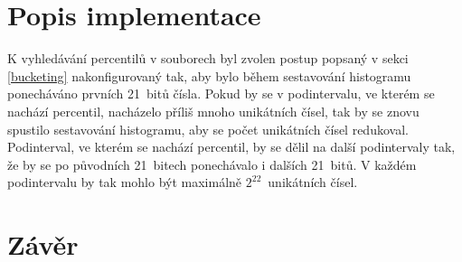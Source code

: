 \documentclass[12pt, a4paper]{article}
\newcommand{\bucketingparamone}{21}
\newcommand{\bucketingparamtwo}{21}
\newcommand{\bucketingparamthree}{22}
\let\oldsection\section
\renewcommand\section{\clearpage\oldsection}
\begin{document}
\section{Popis implementace}

K vyhledávání percentilů v souborech byl zvolen postup popsaný v sekci \ref{bucketing} nakonfigurovaný tak, aby bylo během sestavování histogramu ponecháváno prvních \bucketingparamone~bitů čísla.
Pokud by se v podintervalu, ve kterém se nachází percentil, nacházelo příliš mnoho unikátních čísel, tak by se znovu spustilo sestavování histogramu, aby se počet unikátních čísel redukoval. 
Podinterval, ve kterém se nachází percentil, by se dělil na další podintervaly tak, že by se po původních \bucketingparamone~bitech ponechávalo i dalších \bucketingparamtwo~bitů. 
V každém podintervalu by tak mohlo být maximálně $2^{\bucketingparamthree}$~unikátních čísel.


\section{Závěr}
\end{document}
